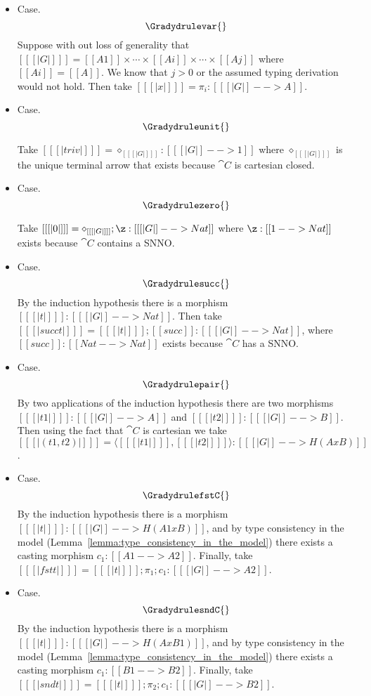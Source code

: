 \begin{itemize} 
\item[] Case.
  \[
  \Gradydrulevar{}
  \]
  Suppose with out loss of generality that $[[ [| G |] ]] = [[A1]]
  \times \cdots \times [[Ai]] \times \cdots \times [[Aj]]$ where
  $[[Ai]] = [[A]]$.  We know that $j > 0$ or the assumed typing
  derivation would not hold.  Then take
  $[[ [| x |] ]] = \pi_i : [[ [| G |] --> A]]$.

\item[] Case.
  \[
  \Gradydruleunit{}
  \]

  Take $[[ [| triv |] ]] = \diamond_{[[ [| G |] ]]} : [[ [| G |] -->
      1]]$ where $\diamond_{[[ [| G |] ]]}$ is the unique terminal
  arrow that exists because $\cat{C}$ is cartesian closed.
  
\item[] Case.
  \[
  \Gradydrulezero{}
  \]

  Take $[[ [| 0 |] ]] = \diamond_{[[ [| G |] ]]};\z : [[ [| G |] --> Nat]]$
  where $\z : [[1 --> Nat]]$ exists because $\cat{C}$
  contains a SNNO.

\item[] Case.
  \[
  \Gradydrulesucc{}
  \]
  By the induction hypothesis there is a morphism \\ $[[ [| t |] ]] : [[ [| G |] --> Nat]]$.  Then
  take $[[ [| succ t |] ]] = [[ [| t |] ]];[[succ]] : [[ [| G |] --> Nat ]]$, where
  $[[succ]] : [[Nat --> Nat]]$ exists because $\cat{C}$ has a SNNO.
  
\item[] Case.
  \[
  \Gradydrulepair{}
  \]
  By two applications of the induction hypothesis there are two morphisms
  $[[ [| t1 |] ]] : [[ [| G |] --> A]]$ and $[[ [| t2 |] ]] : [[ [| G |] --> B]]$.
  Then using the fact that $\cat{C}$ is cartesian we take
  $[[ [| (t1 , t2) |] ]] = \langle [[ [| t1 |] ]] , [[ [| t2 |] ]] \rangle : [[ [| G |] --> H(A x B)]]$.

\item[] Case.
  \[
  \GradydrulefstC{}
  \]
  By the induction hypothesis there is a morphism \\ $[[ [| t |] ]] :
  [[ [| G |] --> H(A1 x B) ]]$, and by type consistency in the model
  (Lemma~\ref{lemma:type_consistency_in_the_model}) there exists a
  casting morphism $c_1 : [[A1 --> A2]]$.
  Finally, take $[[ [| fst t |] ]] = [[ [| t |] ]];\pi_1;c_1 : [[ [| G |] --> A2]]$.

\item[] Case.
  \[
  \GradydrulesndC{}
  \]
  By the induction hypothesis there is a morphism \\ $[[ [| t |] ]] :
  [[ [| G |] --> H(A x B1) ]]$, and by type consistency in the model
  (Lemma~\ref{lemma:type_consistency_in_the_model}) there exists a
  casting morphism $c_1 : [[B1 --> B2]]$.
  Finally, take $[[ [| snd t |] ]] = [[ [| t |] ]];\pi_2;c_1 : [[ [| G |] --> B2]]$.


\end{itemize}

